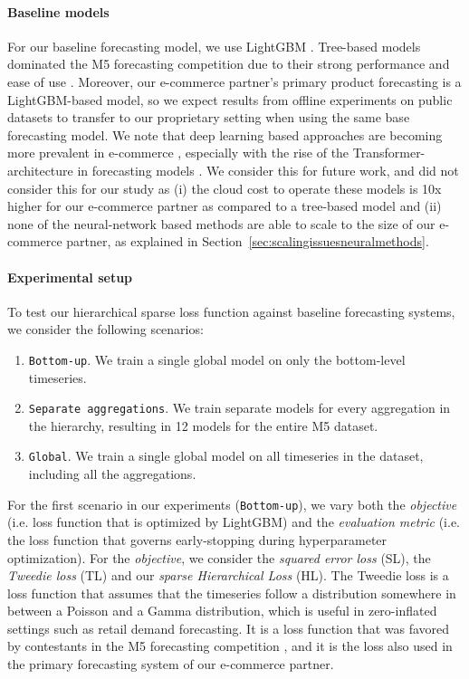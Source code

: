 \documentclass[preprint, 3p, times, twocolumn]{elsarticle}
\begin{document}
  \paragraph{Baseline models} For our baseline forecasting model, we use LightGBM \cite{ke_lightgbm_2017}. Tree-based models dominated the M5 forecasting competition due to their strong performance and ease of use \cite{makridakis_m5_2022,januschowski_forecasting_2022}. Moreover, our e-commerce partner's primary product forecasting is a LightGBM-based model, so we expect results from offline experiments on public datasets to transfer to our proprietary setting when using the same base forecasting model. We note that deep learning based approaches are becoming more prevalent in e-commerce \cite{kunz_deep_2023}, especially with the rise of the Transformer-architecture in forecasting models \cite{lim_temporal_2021,li_enhancing_2019}. We consider this for future work, and did not consider this for our study as (i) the cloud cost to operate these models is 10x higher for our e-commerce partner as compared to a tree-based model and (ii) none of the neural-network based methods are able to scale to the size of our e-commerce partner, as explained in Section~\ref{sec:scalingissuesneuralmethods}.

  \paragraph{Experimental setup} To test our hierarchical sparse loss function against baseline forecasting systems, we consider the following scenarios:
  \begin{enumerate}
    \item \texttt{Bottom-up}. We train a single global model on only the bottom-level timeseries.
    \item \texttt{Separate aggregations}. We train separate models for every aggregation in the hierarchy, resulting in 12 models for the entire M5 dataset.
    \item \texttt{Global}. We train a single global model on all timeseries in the dataset, including all the aggregations.
  \end{enumerate}
  For the first scenario in our experiments (\texttt{Bottom-up}), we vary both the \textit{objective} (i.e. loss function that is optimized by LightGBM) and the \textit{evaluation metric} (i.e. the loss function that governs early-stopping during hyperparameter optimization). For the \textit{objective}, we consider the \textit{squared error loss} (SL), the \textit{Tweedie loss} (TL) and our \textit{sparse Hierarchical Loss} (HL). The Tweedie loss is a loss function that assumes that the timeseries follow a distribution somewhere in between a Poisson and a Gamma distribution, which is useful in zero-inflated settings such as retail demand forecasting. It is a loss function that was favored by contestants in the M5 forecasting competition \cite{januschowski_forecasting_2022}, and it is the loss also used in the primary forecasting system of our e-commerce partner.
\end{document}
